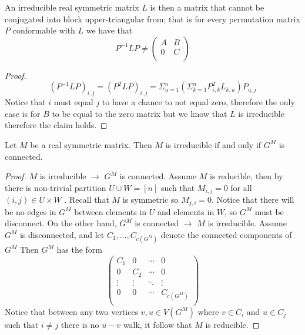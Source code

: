 \documentclass[a4paper, 11pt, oneside]{article}
\newenvironment{problem}[1]
  {\renewcommand\theinnercustomprob{#1}\innercustomprob}
  {\endinnercustomprob}
\begin{document}
\begin{problem}{3.2}\label{problem3.2}
An irreducible real symmetric matrix $L$ is then a matrix that cannot be conjugated into block upper-triangular from; that is for every permutation matrix $P$ conformable with $L$ we have that
\begin{equation*}
P^{-1}LP\neq
\begin{pmatrix}
A  	& B \\ 
0       & C\\
\end{pmatrix} 
\end{equation*}
\end{problem}

\begin{proof}
\begin{equation*}
(P^{-1}LP)_{i,j} = (P^{T}LP)_{i,j} = \Sigma_{u=1}^n (\Sigma_{k=1}^n P^T_{i,k} L_{k,u}) P_{u,j} 
\end{equation*}
Notice that $i$ must equal $j$ to have a chance to not equal zero, therefore the only case is for $B$ to be equal to the zero matrix but we know that $L$ is irreducible therefore the claim holds.
\end{proof}

\begin{problem}{3.3}\label{problem3.3}
Let $M$ be a real symmetric matrix. Then $M$ is irreducible if and only if $G^M$ is connected.
\end{problem}

\begin{proof}
 $M$ is irreducible $\rightarrow$  $G^M$ is connected.
 Assume $M$ is reducible, then by \cite{connectivity_spec} there is non-trivial partition $U\cup W = [n]$ such that $M_{i,j} = 0$ for all $(i,j)\in U \times W$ .
 Recall that $M$ is symmetric so  $M_{j,i} = 0$. Notice that there will be no edges in $G^M$ between elements in $U$ and elements in $W$,  so $G^M$ must be disconnect.
On the other hand,  $G^M$ is connected $\rightarrow$ $M$ is irreducible.
Assume $G^M$ is disconnected, and let $C_1, \ldots, C_{c(G^M)}$ denote the connected components of $G^M$ Then $G^M$ has the form
\begin{equation*}
\begin{pmatrix}
C_1 & 0 &  \cdots & 0 \\ 
0 & C_2 &  \cdots & 0 \\
\vdots & \vdots & \ddots &\vdots \\
0 & 0 & \cdots & C_{c(G^M)} \\ 
\end{pmatrix}
\end{equation*}
Notice that between any two vertices $v, u \in V(G^M)$ where $v \in C_i$ and $u \in C_j$ such that $i \neq j$ there is no $u-v$ walk,
it follow that $M$ is reducible. 
\end{proof}
\end{document}

